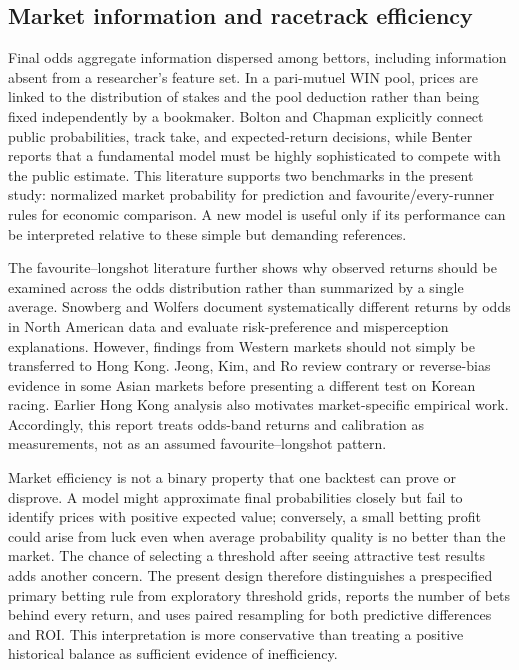 \subsection{Market information and racetrack efficiency}\label{sec:lit-market}
Final odds aggregate information dispersed among bettors, including information absent from a researcher's feature set. In a pari-mutuel WIN pool, prices are linked to the distribution of stakes and the pool deduction rather than being fixed independently by a bookmaker. Bolton and Chapman explicitly connect public probabilities, track take, and expected-return decisions, while Benter reports that a fundamental model must be highly sophisticated to compete with the public estimate\cite{bolton1986,benter1994}. This literature supports two benchmarks in the present study: normalized market probability for prediction and favourite/every-runner rules for economic comparison. A new model is useful only if its performance can be interpreted relative to these simple but demanding references.

The favourite--longshot literature further shows why observed returns should be examined across the odds distribution rather than summarized by a single average. Snowberg and Wolfers document systematically different returns by odds in North American data and evaluate risk-preference and misperception explanations\cite{snowbergwolfers2010}. However, findings from Western markets should not simply be transferred to Hong Kong. Jeong, Kim, and Ro review contrary or reverse-bias evidence in some Asian markets before presenting a different test on Korean racing\cite{jeong2019}. Earlier Hong Kong analysis also motivates market-specific empirical work\cite{chapman1994}. Accordingly, this report treats odds-band returns and calibration as measurements, not as an assumed favourite--longshot pattern.

Market efficiency is not a binary property that one backtest can prove or disprove. A model might approximate final probabilities closely but fail to identify prices with positive expected value; conversely, a small betting profit could arise from luck even when average probability quality is no better than the market. The chance of selecting a threshold after seeing attractive test results adds another concern. The present design therefore distinguishes a prespecified primary betting rule from exploratory threshold grids, reports the number of bets behind every return, and uses paired resampling for both predictive differences and ROI. This interpretation is more conservative than treating a positive historical balance as sufficient evidence of inefficiency.

